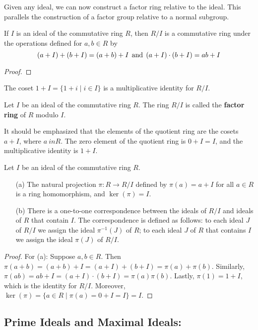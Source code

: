 \documentclass[graybox, reqno]{svmono}
\begin{document}
Given any ideal, we can now construct a factor ring relative to the ideal. This parallels the construction of a factor group relative to a normal subgroup.

\begin{theorem} If $I$ is an ideal of the commutative ring $R$, then $R/I$ is a commutative ring under the operations defined for $a, b \in R$ by \[ (a+I)+(b+I) = (a+b) + I \; \, \textup{and} \; \, (a+I) \cdot (b+I) = ab + I \] 
\end{theorem}
\begin{proof}
\end{proof}
\begin{remark} The coset $1 + I = \{ 1 + i \mid i \in I \}$ is a multiplicative identity for $R/I$.
\end{remark} 
\begin{definition} Let $I$ be an ideal of the commutative ring $R$. The ring $R/I$ is called the \textup{\textbf{factor ring}} of $R$ modulo $I$. 
\end{definition} 
It should be emphasized that the elements of the quotient ring are the cosets $a+I$, where $a\ in R$. The zero element of the quotient ring is $0 + I = I$, and the multiplicative identity is $1 + I$. 
\begin{proposition} Let $I$ be an ideal of the commutative ring $R$. 
\begin{itemize}
\item[\textup{(a)}] The natural projection $\pi \colon R \to R/I$ defined by $\pi (a) = a + I$ for all $a \in R $ is a ring homomorphism, and $\ker (\pi) = I$.

\item[\textup{(b)}] There is a one-to-one correspondence between the ideals of $R/I$ and ideals of $R$ that contain $I$. The correspondence is defined as follows: to each ideal $J$ of $R/I$ we assign the ideal $\pi^{-1} (J)$ of $R$; to each ideal $J$ of $R$ that contains $I$ we assign the ideal $\pi (J)$ of $R/I$. 
\end{itemize}
\end{proposition} 
\begin{proof} For (a): Suppose $a, b \in R$. Then $\pi (a+b) = (a+b) + I  = (a+I) + (b+I) = \pi (a)  + \pi (b)$. Similarly, $\pi (ab) = ab+ I = (a+I) \cdot (b+ I) = \pi (a) \pi (b).$ Lastly, $\pi (1) = 1 + I$, which is the identity for $R/I$. Moreover, $\ker (\pi) = \{ a \in R \mid \pi (a) = 0 + I = I \} = I$. 
\end{proof}
\subsection{Prime Ideals and Maximal Ideals:}
\end{document}
